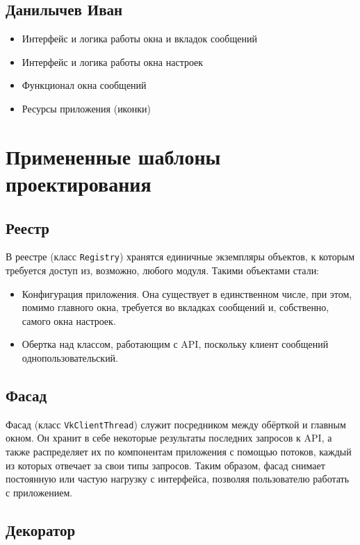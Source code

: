 \documentclass[12pt]{article}
\begin{document}
\subsection{Данилычев Иван}
\begin{itemize}
\setlength{\itemsep}{-1mm}
\item Интерфейс и логика работы окна и вкладок сообщений
\item Интерфейс и логика работы окна настроек
\item Функционал окна сообщений
\item Ресурсы приложения (иконки)
\end{itemize}


\newpage
\section{Примененные шаблоны проектирования}
\subsection{Реестр}
В реестре (класс {\tt Registry}) хранятся единичные экземпляры объектов, к которым требуется доступ из, возможно, любого модуля. Такими объектами стали:
\begin{itemize}
\setlength{\itemsep}{-1mm} %
\item Конфигурация приложения. Она существует в единственном числе, при этом, помимо главного окна, требуется во вкладках сообщений и, собственно, самого окна настроек.
\item Обертка над классом, работающим с API, поскольку клиент сообщений однопользовательский.
\end{itemize}

\subsection{Фасад}
Фасад (класс {\tt VkClientThread}) служит посредником между обёрткой и главным окном. Он хранит в себе некоторые результаты последних запросов к API, 
а также распределяет их по компонентам приложения с помощью потоков, каждый из которых отвечает за свои типы запросов. Таким образом, фасад снимает постоянную или частую нагрузку с интерфейса, позволяя пользователю работать с приложением.

\subsection{Декоратор}
\end{document}
